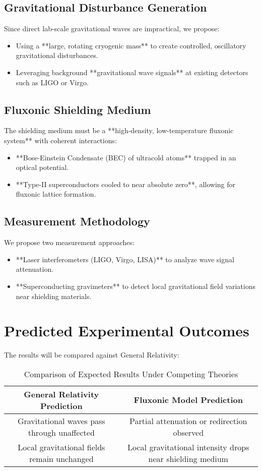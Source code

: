 \documentclass{article}
\begin{document}
\subsection{Gravitational Disturbance Generation}
Since direct lab-scale gravitational waves are impractical, we propose:
\begin{itemize}
    \item Using a **large, rotating cryogenic mass** to create controlled, oscillatory gravitational disturbances.
    \item Leveraging background **gravitational wave signals** at existing detectors such as LIGO or Virgo.
\end{itemize}

\subsection{Fluxonic Shielding Medium}
The shielding medium must be a **high-density, low-temperature fluxonic system** with coherent interactions:
\begin{itemize}
    \item **Bose-Einstein Condensate (BEC) of ultracold atoms** trapped in an optical potential.
    \item **Type-II superconductors cooled to near absolute zero**, allowing for fluxonic lattice formation.
\end{itemize}

\subsection{Measurement Methodology}
We propose two measurement approaches:
\begin{itemize}
    \item **Laser interferometers (LIGO, Virgo, LISA)** to analyze wave signal attenuation.
    \item **Superconducting gravimeters** to detect local gravitational field variations near shielding materials.
\end{itemize}

\section{Predicted Experimental Outcomes}
The results will be compared against General Relativity:
\begin{table}[h]
    \centering
    \begin{tabular}{|c|c|}
        \hline
        \textbf{General Relativity Prediction} & \textbf{Fluxonic Model Prediction} \\
        \hline
        Gravitational waves pass through unaffected & Partial attenuation or redirection observed \\
        \hline
        Local gravitational fields remain unchanged & Local gravitational intensity drops near shielding medium \\
        \hline
    \end{tabular}
    \caption{Comparison of Expected Results Under Competing Theories}
    \label{tab:predictions}
\end{table}
\end{document}
